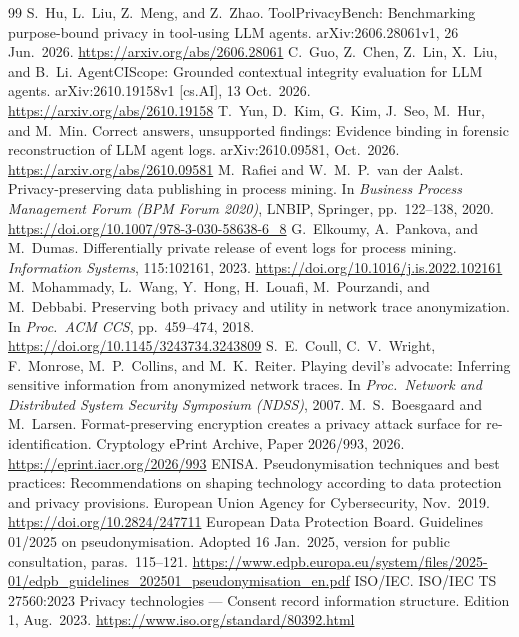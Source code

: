 \documentclass[11pt]{article}
\begin{document}
\begin{thebibliography}{99}
 S.~Hu, L.~Liu, Z.~Meng, and Z.~Zhao. ToolPrivacyBench: Benchmarking purpose-bound privacy in tool-using LLM agents. arXiv:2606.28061v1, 26 Jun.\ 2026. \url{https://arxiv.org/abs/2606.28061}
 C.~Guo, Z.~Chen, Z.~Lin, X.~Liu, and B.~Li. AgentCIScope: Grounded contextual integrity evaluation for LLM agents. arXiv:2610.19158v1 [cs.AI], 13 Oct.\ 2026. \url{https://arxiv.org/abs/2610.19158}
 T.~Yun, D.~Kim, G.~Kim, J.~Seo, M.~Hur, and M.~Min. Correct answers, unsupported findings: Evidence binding in forensic reconstruction of LLM agent logs. arXiv:2610.09581, Oct.\ 2026. \url{https://arxiv.org/abs/2610.09581}
 M.~Rafiei and W.~M.~P.~van der Aalst. Privacy-preserving data publishing in process mining. In \emph{Business Process Management Forum (BPM Forum 2020)}, LNBIP, Springer, pp.~122--138, 2020. \url{https://doi.org/10.1007/978-3-030-58638-6_8}
 G.~Elkoumy, A.~Pankova, and M.~Dumas. Differentially private release of event logs for process mining. \emph{Information Systems}, 115:102161, 2023. \url{https://doi.org/10.1016/j.is.2022.102161}
 M.~Mohammady, L.~Wang, Y.~Hong, H.~Louafi, M.~Pourzandi, and M.~Debbabi. Preserving both privacy and utility in network trace anonymization. In \emph{Proc.\ ACM CCS}, pp.~459--474, 2018. \url{https://doi.org/10.1145/3243734.3243809}
 S.~E.~Coull, C.~V.~Wright, F.~Monrose, M.~P.~Collins, and M.~K.~Reiter. Playing devil's advocate: Inferring sensitive information from anonymized network traces. In \emph{Proc.\ Network and Distributed System Security Symposium (NDSS)}, 2007.
 M.~S.~Boesgaard and M.~Larsen. Format-preserving encryption creates a privacy attack surface for re-identification. Cryptology ePrint Archive, Paper 2026/993, 2026. \url{https://eprint.iacr.org/2026/993}
 ENISA. Pseudonymisation techniques and best practices: Recommendations on shaping technology according to data protection and privacy provisions. European Union Agency for Cybersecurity, Nov.\ 2019. \url{https://doi.org/10.2824/247711}
 European Data Protection Board. Guidelines 01/2025 on pseudonymisation. Adopted 16 Jan.\ 2025, version for public consultation, paras.~115--121. \url{https://www.edpb.europa.eu/system/files/2025-01/edpb_guidelines_202501_pseudonymisation_en.pdf}
 ISO/IEC. ISO/IEC TS 27560:2023 Privacy technologies --- Consent record information structure. Edition 1, Aug.\ 2023. \url{https://www.iso.org/standard/80392.html}

\end{thebibliography}
\end{document}
